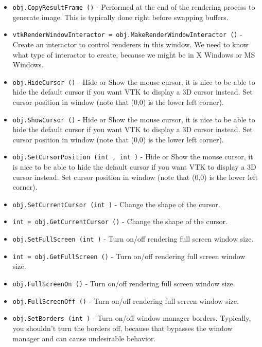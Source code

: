 \begin{itemize}
\item  \verb|obj.CopyResultFrame ()| -  Performed at the end of the rendering process to generate image.
 This is typically done right before swapping buffers.

\item  \verb|vtkRenderWindowInteractor = obj.MakeRenderWindowInteractor ()| -  Create an interactor to control renderers in this window. We need
 to know what type of interactor to create, because we might be in
 X Windows or MS Windows.

\item  \verb|obj.HideCursor ()| -  Hide or Show the mouse cursor, it is nice to be able to hide the
 default cursor if you want VTK to display a 3D cursor instead.
 Set cursor position in window (note that (0,0) is the lower left
 corner).

\item  \verb|obj.ShowCursor ()| -  Hide or Show the mouse cursor, it is nice to be able to hide the
 default cursor if you want VTK to display a 3D cursor instead.
 Set cursor position in window (note that (0,0) is the lower left
 corner).

\item  \verb|obj.SetCursorPosition (int , int )| -  Hide or Show the mouse cursor, it is nice to be able to hide the
 default cursor if you want VTK to display a 3D cursor instead.
 Set cursor position in window (note that (0,0) is the lower left
 corner).

\item  \verb|obj.SetCurrentCursor (int )| -  Change the shape of the cursor.

\item  \verb|int = obj.GetCurrentCursor ()| -  Change the shape of the cursor.

\item  \verb|obj.SetFullScreen (int )| -  Turn on/off rendering full screen window size.

\item  \verb|int = obj.GetFullScreen ()| -  Turn on/off rendering full screen window size.

\item  \verb|obj.FullScreenOn ()| -  Turn on/off rendering full screen window size.

\item  \verb|obj.FullScreenOff ()| -  Turn on/off rendering full screen window size.

\item  \verb|obj.SetBorders (int )| -  Turn on/off window manager borders. Typically, you shouldn't turn the
 borders off, because that bypasses the window manager and can cause
 undesirable behavior.


\end{itemize}
